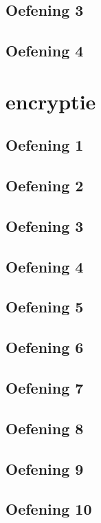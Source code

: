 \documentclass[a4paper,11pt]{report}
\begin{document}
\section{Oefening 3}

\section{Oefening 4}

\newpage

\chapter{encryptie}
\section{Oefening 1}

\section{Oefening 2}

\section{Oefening 3}

\section{Oefening 4}

\section{Oefening 5}

\section{Oefening 6}

\section{Oefening 7}

\section{Oefening 8}

\section{Oefening 9}

\section{Oefening 10}

\end{document}
